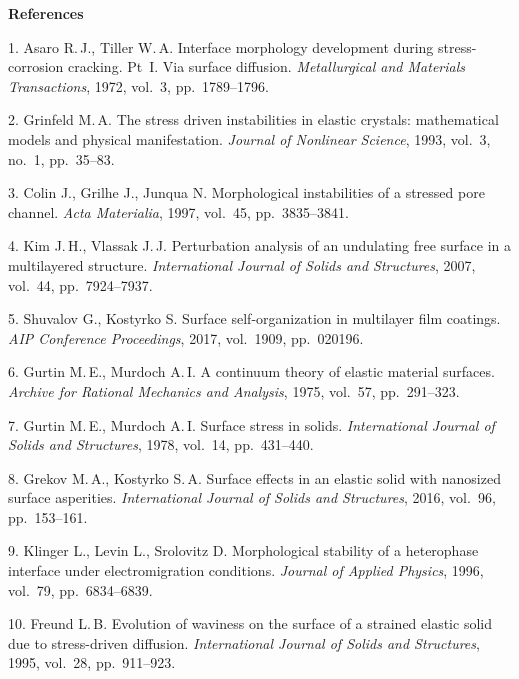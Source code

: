 

{\small



\vskip6mm

\noindent \textbf{References} }

\vskip 2mm

{\footnotesize



1. Asaro R.\,J., Tiller W.\,A. 
Interface morphology development during stress-corrosion cracking. Pt~I. Via surface diffusion. 
{\it Metallurgical and Materials Transactions}, 1972,  vol.~3, pp.~1789--1796.

2. Grinfeld M.\,A. 
The stress driven instabilities in elastic crystals: mathematical models and physical manifestation.  {\it Journal of Nonlinear Science}, 1993, vol.~3, no.~1, pp.~35--83.

3. Colin J., Grilhe J., Junqua N. 
Morphological instabilities of a stressed pore channel. 
{\it Acta Materialia}, 1997, vol.~45, pp.~3835--3841.

4. Kim J.\,H., Vlassak J.\,J. 
Perturbation analysis of an undulating free surface in a multilayered structure. 
{\it International Journal of Solids and Structures},   2007, vol.~44, pp.~7924--7937.

5. Shuvalov G., Kostyrko S.
Surface self-organization in multilayer film coatings. 
{\it AIP Conference Proceedings}, 2017, vol.~1909, pp.~020196.

6. Gurtin M.\,E., Murdoch A.\,I. 
A continuum theory of elastic material surfaces. 
{\it Archive for Rational Mechanics and Analysis},  1975,  vol.~57, pp.~291--323.

7. Gurtin M.\,E., Murdoch A.\,I. 
Surface stress in solids. 
{\it International Journal of Solids and Structures},  1978, vol.~14, pp.~431--440.

8. Grekov M.\,A., Kostyrko S.\,A. 
Surface effects in an elastic solid with nanosized surface asperities. 
{\it International Journal of Solids and Structures}, 2016, vol.~96, pp.~153--161.

9. Klinger L., Levin L., Srolovitz D. 
Morphological stability of a heterophase interface under electromigration conditions. 
{\it Journal of Applied Physics},  1996, vol.~79, pp.~6834--6839.

10. Freund L.\,B. 
Evolution of waviness on the surface of a strained elastic solid due to stress-driven diffusion. 
{\it International Journal of Solids and Structures}, 1995,  vol.~28, pp.~911--923.

}
